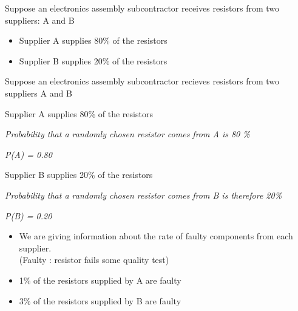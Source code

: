 \documentclass[12pt]{report}
\begin{document}
		
		\Large
		Suppose an electronics assembly subcontractor receives resistors from two suppliers: A and B
		
		\begin{itemize}
			\item Supplier A supplies 80\% of the resistors
			\vspace{2cm}
			\item Supplier B supplies 20\% of the resistors
			\vspace{2cm}
		\end{itemize}
		
		
		\Large
		Suppose an electronics assembly subcontractor recieves resistors from two suppliers A and B
		
		\begin{itemize}
			\item Supplier A supplies 80\% of the resistors
			{
				\Large
				
				\item \textit{Probability that a randomly chosen resistor comes from A is 80 \%}
				\item \textit{P(A) = 0.80 }
				
			}
			\item Supplier B supplies 20\% of the resistors
			\item \textit{Probability that a randomly chosen resistor comes from B is therefore 20\%}
			\item \textit{P(B) = 0.20}
		\end{itemize}
		
		\Large
		\begin{itemize}
			\item We are giving information about the rate of faulty components from each supplier. \\(Faulty : resistor fails some quality test)
			\vspace{1cm}
			\item 1\% of the resistors supplied by A are faulty
			\vspace{1cm}
			\item 3\% of the resistors supplied by B are faulty 
			\vspace{1cm}
		\end{itemize}
		
\end{document}
